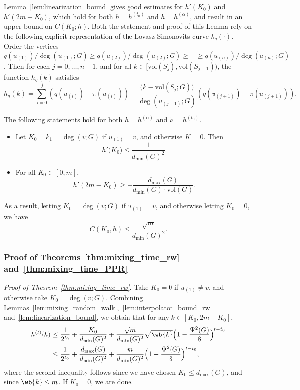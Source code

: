 \documentclass[twoside,11pt]{article}
\newcommand{\1}{\mathbf{1}}
\newcommand{\vol}{\mathrm{vol}}
\begin{document}
Lemma~\ref{lem:linearization_bound} gives good estimates for $h'(K_0)$ and $h'(2m - K_0)$, which hold for both $h = h^{(t_0)}$ and $h = h^{(\alpha)}$, and result in an upper bound on $C(K_0;h)$. Both the statement and proof of this Lemma rely on the following explicit representation of the Lovasz-Simonovits curve $h_q(\cdot)$. Order the vertices $q(u_{(1)})/\deg(u_{(1)};G) \geq q(u_{(2)})/\deg(u_{(2)};G) \geq \cdots \geq q(u_{(n)})/\deg(u_{(n)};G)$. Then for each $j = 0,\ldots,n - 1$, and for all $k \in [\vol(S_j),\vol(S_{j + 1}))$,  the function $h_q(k)$ satisfies
\begin{equation}
\label{eqn:lovasz_simonovits}
h_q(k) = \sum_{i = 0}^{j} \left(q(u_{(i)}) - \pi(u_{(i)})\right) + \frac{\bigl(k - \vol(S_j;G)\bigr)}{\deg(u_{(j + 1)};G)} \left(q(u_{(j+1)}) - \pi(u_{(j+1)})\right). 
\end{equation}
\begin{lemma}
	\label{lem:linearization_bound}
	The following statements hold for both $h = h^{(\alpha)}$ and $h = h^{(t_0)}$. 
	\begin{itemize}
		\item Let $K_0 = k_1 = \deg(v;G)$ if $u_{(1)} = v$, and otherwise $K = 0$. Then  
		\begin{equation}
		\label{eqn:right_derivative_1}
		h'\bigl(K_0\bigr) \leq \frac{1}{d_{\min}(G)^2}.
		\end{equation}
		\item For all $K_0 \in [0,m]$,
		\begin{equation}
		\label{eqn:right_derivative_2}
		h'(2m - K_0) \geq -\frac{d_{\max}(G)}{d_{\min}(G)\cdot \vol(G)}.
		\end{equation}
	\end{itemize}
	As a result, letting $K_0 = \deg(v;G)$ if $u_{(1)} = v$, and otherwise letting $K_0 = 0$, we have
	\begin{equation*}
	C(K_0,h) \leq \frac{\sqrt{m}}{d_{\min}(G)^2}.
	\end{equation*}
\end{lemma}

\subsubsection{Proof of Theorems~\ref{thm:mixing_time_rw} and~\ref{thm:mixing_time_PPR}}

\noindent \emph{Proof of Theorem~\ref{thm:mixing_time_rw}.}
Take $K_0 = 0$ if $u_{(1)} \neq v$, and otherwise take $K_0 = \deg(v;G)$. Combining Lemmas~\ref{lem:mixing_random_walk},~\ref{lem:interpolator_bound_rw} and~\ref{lem:linearization_bound}, we obtain that for any $k \in [K_0,2m - K_0]$, 
\begin{align*}
h^{(t)}(k) & \leq \frac{1}{2^{t_0}} + \frac{K_0}{d_{\min}(G)^2}  + \frac{\sqrt{m}}{d_{\min}(G)^2} \sqrt{\wb{k}} \Bigl(1 - \frac{\Psi^2(G)}{8}\Bigr)^{t-t_0} \\
& \leq \frac{1}{2^{t_0}} + \frac{d_{\max}(G)}{d_{\min}(G)^2}  + \frac{m}{d_{\min}(G)^2} \Bigl(1 - \frac{\Psi^2(G)}{8}\Bigr)^{t-t_0},
\end{align*}
where the second inequality follows since we have chosen $K_0 \leq d_{\max}(G)$, and since $\wb{k} \leq m$. If $K_0 = 0$, we are done. 
\end{document}
